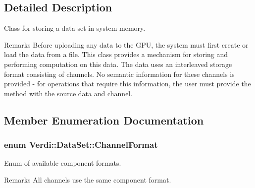 \subsection{\-Detailed \-Description}
\-Class for storing a data set in system memory. \begin{DoxyRemark}{\-Remarks}
\-Before uploading any data to the \-G\-P\-U, the system must first create or load the data from a file. \-This class provides a mechanism for storing and performing computation on this data. \-The data uses an interleaved storage format consisting of channels. \-No semantic information for these channels is provided -\/ for operations that require this information, the user must provide the method with the source data and channel. 
\end{DoxyRemark}


\subsection{\-Member \-Enumeration \-Documentation}
\hypertarget{class_verdi_1_1_data_set_abd6d238fa4dff1b0ea6abd391d14ed64}{
\subsubsection[{\-Channel\-Format}]{\setlength{\rightskip}{0pt plus 5cm}enum {\bf \-Verdi\-::\-Data\-Set\-::\-Channel\-Format}}}\label{class_verdi_1_1_data_set_abd6d238fa4dff1b0ea6abd391d14ed64}
\-Enum of available component formats. \begin{DoxyRemark}{\-Remarks}
\-All channels use the same component format. 
\end{DoxyRemark}


